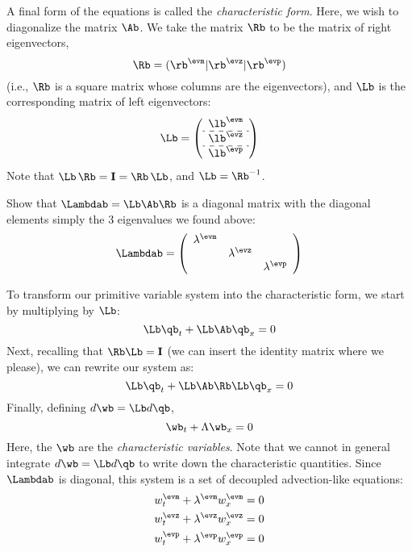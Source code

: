A final form of the equations is called the {\em characteristic form}.  Here,
we wish to diagonalize the matrix $\Ab$.  We take the matrix $\Rb$ to be the
matrix of right eigenvectors,
\begin{equation}
\Rb = (\rb^\evm | \rb^\evz | \rb^\evp )
\end{equation}
(i.e., $\Rb$ is a square matrix whose columns are the eigenvectors),
and $\Lb$
is the corresponding matrix of left eigenvectors:
\begin{equation}
\Lb = \left ( \begin{array}{c} \lb^\evm \\
                             \hdashline
                             \lb^\evz \\
                             \hdashline
                             \lb^\evp \end{array} \right )
\end{equation}
Note that $\Lb\, \Rb = {\bf I} = \Rb\, \Lb$, and $\Lb = \Rb^{-1}$.
\begin{exercise}
{
Show that $\Lambdab = \Lb \Ab \Rb$ is a diagonal matrix with the diagonal elements
simply the 3 eigenvalues we found above:
\begin{equation}
\Lambdab =
   \left ( \begin{array}{ccc}
             \lambda^\evm &              & \\
                          & \lambda^\evz & \\
                          &              & \lambda^\evp \end{array} \right )
\end{equation}
}
\end{exercise}
To transform our primitive variable system into the characteristic form, we
start by multiplying by $\Lb$:
\begin{equation}
\Lb\qb_t + \Lb \Ab \qb_x = 0
\end{equation}
Next, recalling that $\Rb\Lb = {\bf I}$ (we can insert
the identity matrix where we please), we can rewrite our system as:
\begin{equation}
\Lb\qb_t + \Lb \Ab \Rb \Lb \qb_x = 0
\end{equation}
Finally, defining $d\wb = \Lb d\qb$,
\begin{equation}
\wb_t + \Lambda \wb_x = 0
\end{equation}
Here, the $\wb$ are the {\em characteristic variables}.  Note that we cannot
in general integrate $d\wb = \Lb d\qb$ to write down the characteristic
quantities.  Since $\Lambdab$ is diagonal, this system is a set of
decoupled advection-like equations:
\begin{align}
w_t^\evm + \lambda^\evm w_x^\evm &= 0 \\
w_t^\evz + \lambda^\evz w_x^\evz &= 0 \\
w_t^\evp + \lambda^\evp w_x^\evp &= 0
\end{align}

